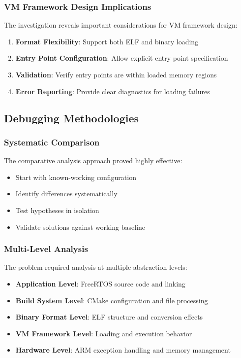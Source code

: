 \documentclass[11pt,a4paper]{article}
\begin{document}
\subsubsection{VM Framework Design Implications}

The investigation reveals important considerations for VM framework design:

\begin{enumerate}
\item \textbf{Format Flexibility}: Support both ELF and binary loading
\item \textbf{Entry Point Configuration}: Allow explicit entry point specification
\item \textbf{Validation}: Verify entry points are within loaded memory regions
\item \textbf{Error Reporting}: Provide clear diagnostics for loading failures
\end{enumerate}

\subsection{Debugging Methodologies}

\subsubsection{Systematic Comparison}

The comparative analysis approach proved highly effective:
\begin{itemize}
\item Start with known-working configuration
\item Identify differences systematically
\item Test hypotheses in isolation
\item Validate solutions against working baseline
\end{itemize}

\subsubsection{Multi-Level Analysis}

The problem required analysis at multiple abstraction levels:
\begin{itemize}
\item \textbf{Application Level}: FreeRTOS source code and linking
\item \textbf{Build System Level}: CMake configuration and file processing
\item \textbf{Binary Format Level}: ELF structure and conversion effects
\item \textbf{VM Framework Level}: Loading and execution behavior
\item \textbf{Hardware Level}: ARM exception handling and memory management
\end{itemize}
\end{document}
